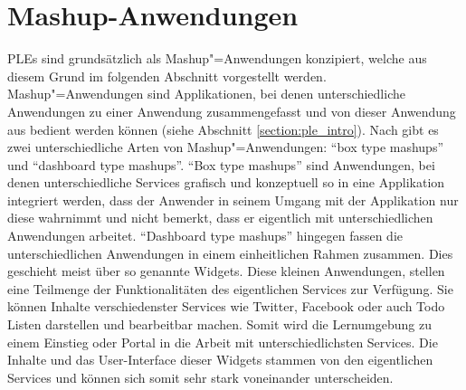 \section{Mashup-Anwendungen}\label{section:mashup_anwendungen}
\acp{PLE} sind grundsätzlich als Mashup"=Anwendungen konzipiert, welche aus diesem Grund im folgenden Abschnitt vorgestellt werden. Mashup"=Anwendungen sind Applikationen, bei denen unterschiedliche Anwendungen zu einer Anwendung zusammengefasst und von dieser Anwendung aus bedient werden können (siehe Abschnitt \ref{section:ple_intro}). Nach \cite{Soylu2011} gibt es zwei unterschiedliche Arten von Mashup"=Anwendungen: "`box type mashups"' und "`dashboard type mashups"'. "`Box type mashups"' sind Anwendungen, bei denen unterschiedliche Services grafisch und konzeptuell so in eine Applikation integriert werden, dass der Anwender in seinem Umgang mit der Applikation nur diese wahrnimmt und nicht bemerkt, dass er eigentlich mit unterschiedlichen Anwendungen arbeitet. "`Dashboard type mashups"' hingegen fassen die unterschiedlichen Anwendungen in einem einheitlichen Rahmen zusammen. Dies geschieht meist über so genannte Widgets. Diese kleinen Anwendungen, stellen eine Teilmenge der Funktionalitäten des eigentlichen Services zur Verfügung. Sie können Inhalte verschiedenster Services wie Twitter, Facebook oder auch Todo Listen darstellen und bearbeitbar machen. Somit wird die Lernumgebung zu einem Einstieg oder Portal in die Arbeit mit unterschiedlichsten Services.  Die Inhalte und das User-Interface dieser Widgets stammen von den eigentlichen Services und können sich somit sehr stark voneinander unterscheiden. 

